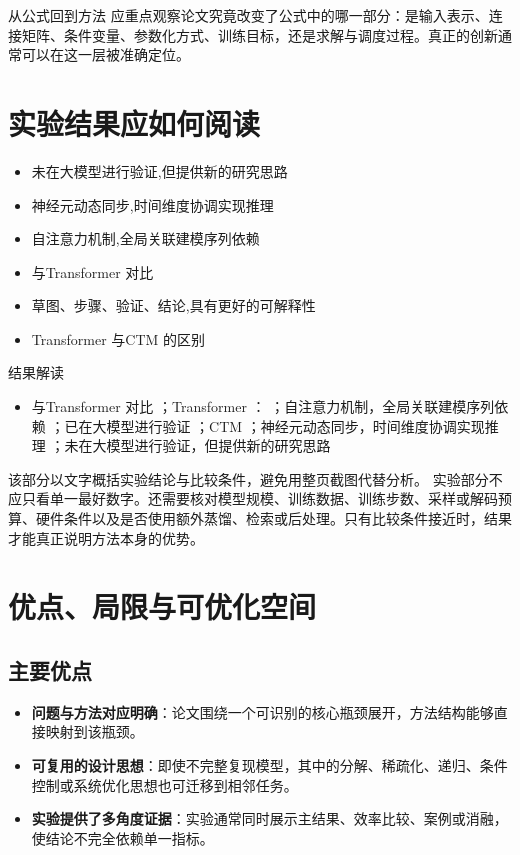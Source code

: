\documentclass[UTF8,11pt,a4paper]{ctexart}
\newcommand{\term}[1]{\textbf{\textcolor{mainblue}{#1}}}
\begin{document}
\begin{keybox}{从公式回到方法}
应重点观察论文究竟改变了公式中的哪一部分：是输入表示、连接矩阵、条件变量、参数化方式、训练目标，还是求解与调度过程。真正的创新通常可以在这一层被准确定位。
\end{keybox}


\section{实验结果应如何阅读}
\begin{itemize}
\item 未在大模型进行验证,但提供新的研究思路
\item 神经元动态同步,时间维度协调实现推理
\item 自注意力机制,全局关联建模序列依赖
\item 与Transformer 对比
\item 草图、步骤、验证、结论,具有更好的可解释性
\item Transformer 与CTM 的区别
\end{itemize}

\begin{notebox}{结果解读}
\begin{itemize}
\item 与Transformer 对比 ；Transformer ： ；自注意力机制，全局关联建模序列依赖 ；已在大模型进行验证 ；CTM ；神经元动态同步，时间维度协调实现推理 ；未在大模型进行验证，但提供新的研究思路
\end{itemize}
\end{notebox}

该部分以文字概括实验结论与比较条件，避免用整页截图代替分析。
实验部分不应只看单一最好数字。还需要核对模型规模、训练数据、训练步数、采样或解码预算、硬件条件以及是否使用额外蒸馏、检索或后处理。只有比较条件接近时，结果才能真正说明方法本身的优势。

\section{优点、局限与可优化空间}
\subsection{主要优点}
\begin{itemize}
\item \term{问题与方法对应明确}：论文围绕一个可识别的核心瓶颈展开，方法结构能够直接映射到该瓶颈。
\item \term{可复用的设计思想}：即使不完整复现模型，其中的分解、稀疏化、递归、条件控制或系统优化思想也可迁移到相邻任务。
\item \term{实验提供了多角度证据}：实验通常同时展示主结果、效率比较、案例或消融，使结论不完全依赖单一指标。
\end{itemize}
\end{document}
